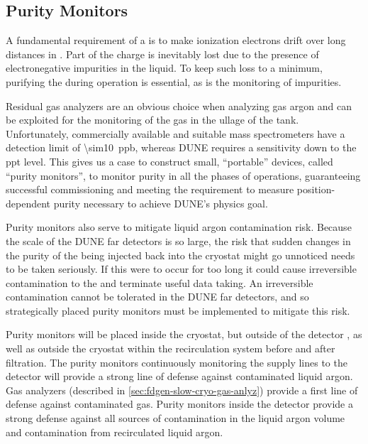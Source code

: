\subsection{Purity Monitors} 
\label{sec:fdgen-slow-cryo-purity-mon}
\label{sec:fdsp-slow-cryo-purity-mon} %
\label{sec:fddp-slow-cryo-purity-mon} %
A fundamental requirement of a   is to make ionization electrons drift over long distances in . Part of the charge is inevitably lost due to the presence of electronegative impurities in the liquid. To keep such loss to a minimum, purifying the  during operation is essential, as is the monitoring of impurities.

Residual gas analyzers are an obvious choice when analyzing gas argon and can be exploited for the monitoring of the gas in the ullage of the tank. Unfortunately, commercially available and suitable mass spectrometers have a detection limit of \SI{\sim10}{ppb}, whereas DUNE requires a sensitivity down to the \si{ppt} level. This gives us a case to construct small, ``portable'' devices, called ``purity monitors'', to monitor purity in all the phases of operations, guaranteeing successful commissioning and meeting the requirement to measure position-dependent purity necessary to achieve DUNE's physics goal. 

Purity monitors also serve to mitigate liquid argon contamination risk.  Because the scale of the DUNE far detectors is so large, the risk that sudden changes in the purity of the  being injected back into the cryostat might go unnoticed needs to be taken seriously.  If this were to occur for too long it could cause irreversible contamination to the  and terminate useful data taking.  An irreversible contamination cannot be tolerated in the DUNE far detectors, and so strategically placed purity monitors must be implemented to mitigate this risk. 

Purity monitors will be placed inside the cryostat, but outside of the detector , as well as outside the cryostat within the recirculation system before and after filtration. The purity monitors continuously monitoring the  supply lines to the detector will provide a strong line of defense against contaminated liquid argon. Gas analyzers (described in \ref{sec:fdgen-slow-cryo-gas-anlyz}) provide a first line of defense against contaminated gas.  Purity monitors inside the detector provide a strong defense against all sources of contamination in the liquid argon volume and contamination from recirculated liquid argon.

